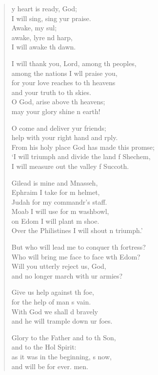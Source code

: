 \settowidth{\versewidth}{From his holy place God has made this promise; +}
\begin{verse}%
  \begin{patverse}
y heart is ready,  God;\Med\\
I will sing, sing yur praise.\\
Awake, my sul;\Flex\\
awake, lyre nd harp,\Med\\
I will awake th dawn.

I will thank you, Lord, among th peoples,\Med\\
among the nations I w\pointup{\i}ll praise you,\\
for your love reaches to th heavens\Med\\
and your truth to th skies.\\
O God, arise above th heavens;\Med\\
may your glory shine n earth!

O come and deliver yur friends;\Med\\
help with your right hand and rply.\\
From his holy place God has made this prom\pointup{\i}se;\Flex\\
‘I will triumph and divide the land f Shechem,\\
I will measure out the valley f Succoth.

Gilead is mine and Mnasseh,\Med\\
Ephraim I take for m helmet,\\
Judah for my commandr’s staff.\Med\\
Moab I will use for m washbowl,\\
on Edom I will plant m shoe.\Med\\
Over the Philistines I will shout \pointup{\i}n triumph.’

But who will lead me to conquer th fortress?\Med\\
Who will bring me face to face w\pointup{\i}th Edom?\\
Will you utterly reject us,  God,\Med\\
and no longer march with ur armies?

Give us help against th foe,\Med\\
for the help of man \pointup{\i}s vain.\\
With God we shall d bravely\Med\\
and he will trample down ur foes.

Glory to the Father and to th Son,\Med\\
and to the Hol Spirit:\\
as it was in the beginning, \pointup{\i}s now,\Med\\
and will be for ever. men.
  \end{patverse}
  \end{verse}
